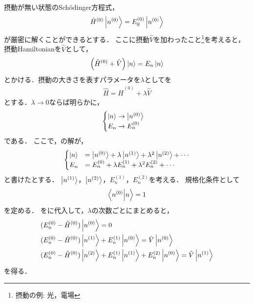 \documentclass{report}
\begin{document}
  摂動が無い状態のSch\"odinger方程式，
  \begin{equation}
    \hat{H}^{(0)}\ket{n^{(0)}}=E_0^{(0)}\ket{n^{(0)}}
  \end{equation}
  が厳密に解くことができるとする．
  ここに摂動$\hat{V}$を加わったこと\footnote{摂動の例: 光，電場}を考えると，摂動Hamiltonianを$\hat{V}$として，
  \begin{equation}
    \qty(\hat{H}^{(0)} + \hat{V})\ket{n} = E_n\ket{n}\label{perturbation-origin}
  \end{equation}
  とかける．摂動の大きさを表すパラメータを$\lambda$としてを
  \begin{align}
    \hat{H} = \hat{H}^{(0)} + \lambda\hat{V}\label{perturbation-using-lambda}
  \end{align}
  とする．$\lambda\to 0$ならば明らかに，
  \begin{equation}
    \begin{cases}
      \ket{n}\to\ket{n^{(0)}}\\
      E_n\to E_n^{(0)}
    \end{cases}
  \end{equation}
  である．
  ここで，の解が，%
  \begin{equation}
    \begin{cases}
      \ket{n} &= \ket{n^{(0)}} + \lambda\ket{n^{(1)}} + \lambda^2\ket{n^{(2)}} + \cdots \label{n-en-expantion} \\
      E_n &= E_n^{(0)} + \lambda E_n^{(1)} + \lambda^2 E_n^{(2)} + \cdots 
    \end{cases}
  \end{equation}
  と書けたとする．
  $\ket{n^{(1)}}$，$\ket{n^{(2)}}$，$E_n^{(1)}$，$E_n^{(2)}$を考える．
  規格化条件として
  \begin{equation}
    \braket{n^{(0)}}{n} = 1
  \end{equation}
  を定める．
  をに代入して，$\lambda$の次数ごとにまとめると，
  \begin{align}
    &(E_n^{(0)} - \hat{H}^{(0)})\ket{n^{(0)}} = 0 \label{0-order} \\ 
    &(E_n^{(0)} - \hat{H}^{(0)})\ket{n^{(1)}} + E_n^{(1)}\ket{n^{(0)}} = \hat{V}\ket{n^{(0)}} \label{1st-perturbation} \\
    &(E_n^{(0)} - \hat{H}^{(0)})\ket{n^{(2)}} + E_n^{(1)}\ket{n^{(1)}} + E_n^{(2)}\ket{n^{(0)}} = \hat{V}\ket{n^{(1)}} \label{2nd-perturbation}\\
  \end{align}
  を得る．
\end{document}
